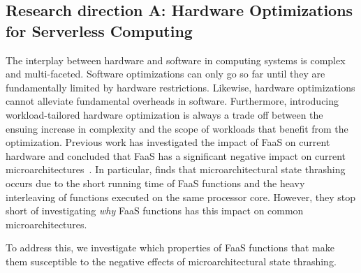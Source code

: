 \documentclass[../main.tex]{subfiles}
\begin{document}
\begin{refsection}
\subsection{Research direction A: Hardware Optimizations for Serverless Computing}
\label{sec:rda}

The interplay between hardware and software in computing systems is
complex and multi-faceted. Software optimizations can only go so far
until they are fundamentally limited by hardware
restrictions. Likewise, hardware optimizations cannot alleviate
fundamental overheads in software. Furthermore, introducing
workload-tailored hardware optimization is always a trade off between
the ensuing increase in complexity and the scope of workloads that
benefit from the optimization. Previous work has investigated the
impact of FaaS on current hardware and concluded that FaaS has a
significant negative impact on current
microarchitectures~\cite{shahrad19_archit_implic_funct_servic_comput,lukewarm_serverless}. In
particular, \textcite{lukewarm_serverless} finds that
microarchitectural state thrashing occurs due to the short running
time of FaaS functions and the heavy interleaving of functions
executed on the same processor core. However, they stop short of investigating \emph{why} FaaS
functions has this impact on common microarchitectures.

To address this, we investigate which properties of FaaS functions
that make them susceptible to the negative effects of
microarchitectural state thrashing.




\end{refsection}
\end{document}
